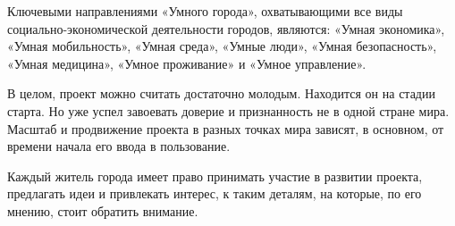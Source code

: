 Ключевыми направлениями «Умного города», охватывающими все виды социально-экономической деятельности городов, являются: «Умная экономика», «Умная мобильность», «Умная среда», «Умные люди», «Умная безопасность», «Умная медицина», «Умное проживание» и «Умное управление». 

В целом, проект можно считать достаточно молодым. Находится он на стадии старта. Но уже успел завоевать доверие и признанность не в одной стране мира. Масштаб и продвижение проекта в разных точках мира зависят, в основном, от времени начала его ввода в пользование. 

Каждый житель города имеет право принимать участие в развитии проекта, предлагать идеи и привлекать интерес, к таким деталям, на которые, по его мнению, стоит обратить внимание. 